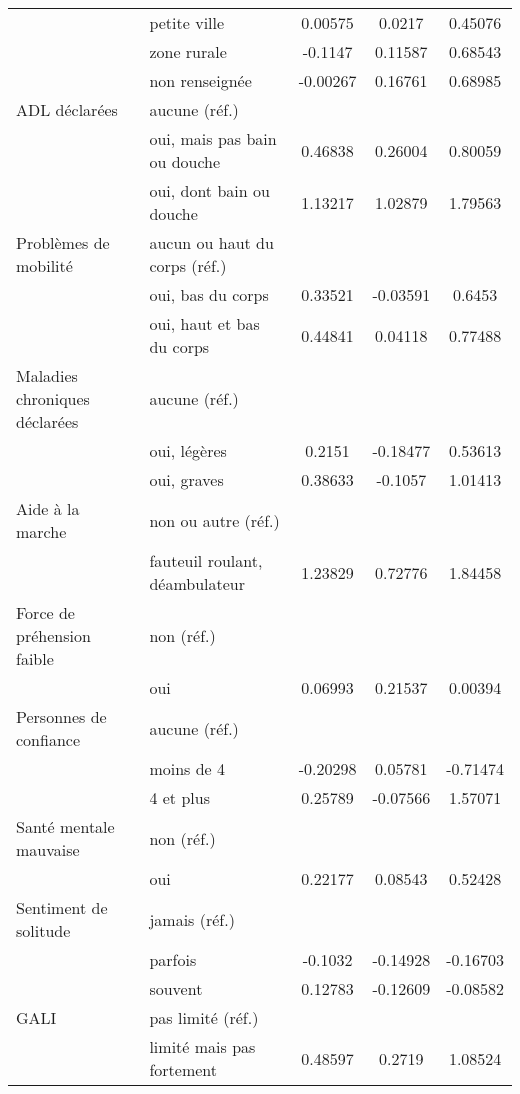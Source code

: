 \begin{Article}
\begin{refsection}[Bonnal]
\begin{table}
{\begin{threeparttable}
\begin{tabular}{l@{\quad}l@{} S!{\quad}S!{\quad}S!{\quad}}
		& petite ville & 0.00575 & 0.0217 & 0.45076\sym{*} \\
		& zone rurale & -0.1147 & 0.11587 & 0.68543\sym{***} \\
		& non renseignée & -0.00267 & 0.16761 & 0.68985\sym{**} \\\hline
		ADL déclarées& aucune (réf.) & & & \\
		& oui, mais pas bain ou douche & 0.46838\sym{***} & 0.26004\sym{**} & 0.80059\sym{***} \\
		& oui, dont bain ou douche & 1.13217\sym{***} & 1.02879\sym{***} & 1.79563\sym{***} \\\hline
		Problèmes de mobilité& aucun ou haut du corps (réf.)& & & \\
		& oui, bas du corps & 0.33521\sym{***} & -0.03591 & 0.6453\sym{***} \\
		& oui, haut et bas du corps & 0.44841\sym{***} & 0.04118 & 0.77488\sym{***} \\\hline
		Maladies chroniques déclarées & aucune (réf.) & & & \\
		& oui, légères & 0.2151\sym{**} & -0.18477 & 0.53613 \\
		& oui, graves & 0.38633\sym{***} & -0.1057 & 1.01413\sym{***} \\ \hline
		Aide à la marche & non ou autre (réf.) & & & \\
		& fauteuil roulant, déambulateur & 1.23829\sym{***} & 0.72776\sym{***} & 1.84458\sym{***} \\\hline
		Force de préhension faible & non (réf.) & & &  \\
		& oui & 0.06993 & 0.21537\sym{***} & 0.00394 \\\hline
		Personnes de confiance  & aucune (réf.) & & &  \\
		& moins de 4 & -0.20298 & 0.05781 & -0.71474 \\
		& 4 et plus & 0.25789\sym{*} & -0.07566 & 1.57071\sym{***} \\\hline
		Santé mentale mauvaise  & non (réf.) & & &  \\
		& oui & 0.22177\sym{***} & 0.08543 & 0.52428\sym{***} \\\hline
		Sentiment de solitude& jamais (réf.) & & & \\
		 & parfois & -0.1032 & -0.14928\sym{**} & -0.16703 \\
		& souvent & 0.12783 & -0.12609 & -0.08582 \\\hline
		GALI & pas limité (réf.)& & & \\
		& limité mais pas fortement & 0.48597\sym{***} & 0.2719\sym{***} & 1.08524\sym{***} \\

\end{tabular}
\end{threeparttable}}
\end{table}
\end{refsection}
\end{Article}
